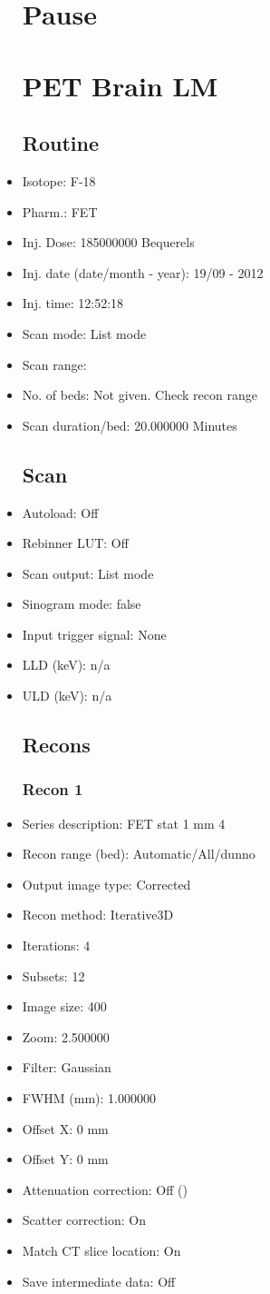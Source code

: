 \documentclass[12pt]{article}
\begin{document}
\begin{itemize}
\section{Pause}
\section{PET Brain LM}\subsection{Routine}
\item Isotope: F-18
\item Pharm.: FET
\item Inj. Dose: 185000000 Bequerels
\item Inj. date (date/month - year): 19/09 - 2012
\item Inj. time: 12:52:18
\item Scan mode: List mode
\item Scan range: 
\item No. of beds: Not given. Check recon range
\item Scan duration/bed: 20.000000 Minutes
\subsection{Scan}
\item Autoload: Off
\item Rebinner LUT: Off
\item Scan output: List mode
\item Sinogram mode: false
\item Input trigger signal: None
\item LLD (keV): n/a
\item ULD (keV): n/a
\subsection{Recons}
\subsubsection{Recon 1}
\item Series description: FET stat 1 mm 4
\item Recon range (bed): Automatic/All/dunno
\item Output image type: Corrected
\item Recon method: Iterative3D
\item Iterations: 4
\item Subsets: 12
\item Image size: 400
\item Zoom: 2.500000
\item Filter: Gaussian
\item FWHM (mm): 1.000000
\item Offset X: 0 mm
\item Offset Y: 0 mm
\item Attenuation correction: Off ()
\item Scatter correction: On
\item Match CT slice location: On
\item Save intermediate data: Off

\end{itemize}
\end{document}
